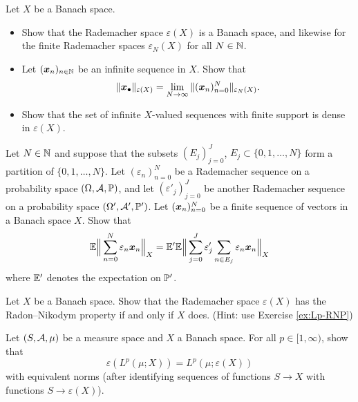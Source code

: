 \begin{exercise}\label{ex:on-rad-spaces}
  Let $X$ be a Banach space.
  \begin{itemize}
  \item
    Show that the Rademacher space $\varepsilon(X)$ is a Banach space, and likewise for the finite Rademacher spaces $\varepsilon_{N}(X)$ for all $N \in \N$.
  \item
    Let $(\mb{x}_{n})_{n \in \N}$ be an infinite sequence in $X$.
    Show that
    \begin{equation*}
      \|\mb{x}_{\bullet}\|_{\varepsilon(X)} = \lim_{N \to \infty} \|(\mb{x}_{n})_{n=0}^{N}\|_{\varepsilon_{N}(X)}.
    \end{equation*}
  \item
    Show that the set of infinite $X$-valued sequences with finite support is dense in $\varepsilon(X)$.
  \end{itemize}
\end{exercise}

\begin{exercise}
  Let $N \in \N$ and suppose that the subsets $(E_{j})_{j=0}^{J}$, $E_{j} \subset \{0,1,\ldots,N\}$ form a partition of $\{0,1,\ldots,N\}$.
  Let $(\varepsilon_{n})_{n=0}^{N}$ be a Rademacher sequence on a probability space $(\Omega,\mc{A},\P)$, and let $(\varepsilon'_{j})_{j=0}^{J}$ be another Rademacher sequence on a probability space $(\Omega', \mc{A}', \P')$.
  Let $(\mb{x}_{n})_{n=0}^{N}$ be a finite sequence of vectors in a Banach space $X$.
  Show that
  \begin{equation*}
    \E \Big\| \sum_{n=0}^{N} \varepsilon_{n} \mb{x}_{n} \Big\|_{X} = \E' \E \Big\| \sum_{j=0}^{J} \varepsilon'_{j} \sum_{n \in E_{j}} \varepsilon_{n} \mb{x}_{n} \Big\|_{X}
  \end{equation*}
  where $\E'$ denotes the expectation on $\P'$.
\end{exercise}

\begin{exercise}
  Let $X$ be a Banach space.
  Show that the Rademacher space $\varepsilon(X)$ has the Radon--Nikodym property if and only if $X$ does. (Hint: use Exercise \ref{ex:Lp-RNP})
\end{exercise}

\begin{exercise}\label{ex:rad-leb-comm}
  Let $(S,\mc{A},\mu)$ be a measure space and $X$ a Banach space.
  For all $p \in [1,\infty)$, show that
  \begin{equation*}
    \varepsilon(L^{p}(\mu;X)) = L^{p}(\mu;\varepsilon(X))
  \end{equation*}
  with equivalent norms (after identifying sequences of functions $S \to X$ with functions $S \to \varepsilon(X)$). 
\end{exercise}

